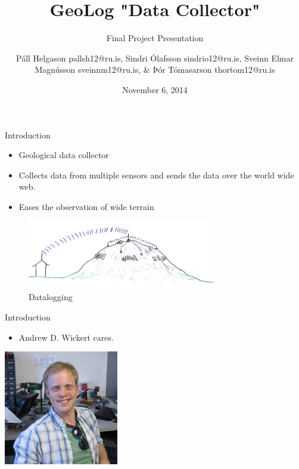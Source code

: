 \documentclass{beamer}
\title{GeoLog "Data Collector"}
\subtitle{Final Project Presentation}
\author[P. Helgasson, S. Ólafsson, S. Magnússon, \& Þ. Tómasarson]{Páll Helgason pallsh12@ru.is, Sindri Ólafsson sindrio12@ru.is, Sveinn Elmar Magnússon sveinnm12@ru.is, \& Þór Tómasarson thortom12@ru.is}
\institute[RU]{
  Department of Science and Engineering (TVD) \\
  Reykjavík University \\
}
\date{November 6, 2014} %
\begin{document}
\begin{frame}[plain]
  \titlepage
\end{frame}

\begin{frame}{Introduction}
	\begin{itemize}
	\item Geological data collector
	\item Collects data from multiple sensors and sends the data over the world wide web. 
	\item Eases the observation of wide terrain
	\end{itemize}
	\begin{figure}
			\centering
	        \includegraphics[height=3cm]{graphics/GeoLog.PNG}
	        \caption{Datalogging}
	\end{figure}
\end{frame}

\begin{frame}{Introduction}
\begin{itemize}
\item Andrew D. Wickert cares.
\end{itemize}
\centering
\includegraphics[height=5cm]{graphics/andrewWickert.png}
\cite{andrewWickert}
\end{frame}
\end{document}

